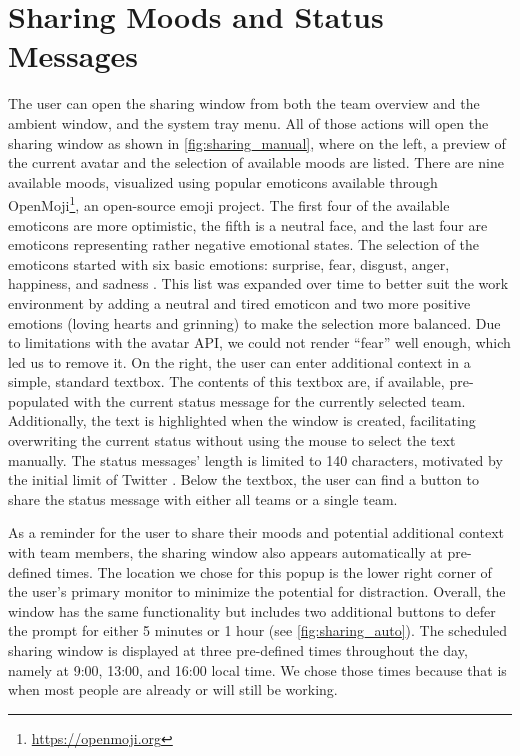 \section{Sharing Moods and Status Messages}
The user can open the sharing window from both the team overview and the ambient window, and the system tray menu. All of those actions will open the sharing window as shown in \autoref{fig:sharing_manual}, where on the left, a preview of the current avatar and the selection of available moods are listed. There are nine available moods, visualized using popular emoticons available through OpenMoji\footnote{\url{https://openmoji.org}}, an open-source emoji project. The first four of the available emoticons are more optimistic, the fifth is a neutral face, and the last four are emoticons representing rather negative emotional states. The selection of the emoticons started with six basic emotions: surprise, fear, disgust, anger, happiness, and sadness \autocite{an2017two}. This list was expanded over time to better suit the work environment by adding a neutral and tired emoticon and two more positive emotions (loving hearts and grinning) to make the selection more balanced. Due to limitations with the avatar API, we could not render \enquote{fear} well enough, which led us to remove it. On the right, the user can enter additional context in a simple, standard textbox. The contents of this textbox are, if available, pre-populated with the current status message for the currently selected team. Additionally, the text is highlighted when the window is created, facilitating overwriting the current status without using the mouse to select the text manually. The status messages' length is limited to 140 characters, motivated by the initial limit of Twitter \autocite{dullemond2013fixing}. Below the textbox, the user can find a button to share the status message with either all teams or a single team.

As a reminder for the user to share their moods and potential additional context with team members, the sharing window also appears automatically at pre-defined times. The location we chose for this popup is the lower right corner of the user's primary monitor to minimize the potential for distraction. Overall, the window has the same functionality but includes two additional buttons to defer the prompt for either 5 minutes or 1 hour (see \autoref{fig:sharing_auto}). The scheduled sharing window is displayed at three pre-defined times throughout the day, namely at 9:00, 13:00, and 16:00 local time. We chose those times because that is when most people are already or will still be working.

